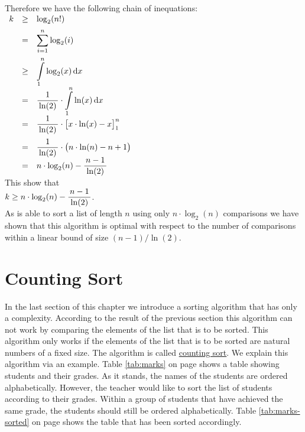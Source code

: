 Therefore we have the following chain of inequations:
\\[0.2cm]
\hspace*{1.3cm}
$
\begin{array}[t]{lcl}
  k & \geq & \displaystyle\log_2(n!) \\[0.2cm]
    & =    & \displaystyle\sum\limits_{i=1}^n \log_2(i) \\[0.5cm]
    & \geq & \displaystyle\int\limits_{1}^n \log_2(x)\, \mathrm{d}x \\[0.2cm]
    & =    & \displaystyle\frac{1}{\,\ln(2)\,} \cdot \int\limits_{1}^n \ln(x)\, \mathrm{d}x  \\[0.2cm]
    & =    & \displaystyle\frac{1}{\,\ln(2)\,} \cdot \bigl[x \cdot \ln(x) - x \bigr]_{1}^n   \\[0.4cm]
    & =    & \displaystyle\frac{1}{\,\ln(2)\,} \cdot \bigl(n \cdot \ln(n) - n + 1\bigr)     \\[0.2cm]
    & =    & \displaystyle n \cdot \log_2(n) - \frac{\,n-1\,}{\,\ln(2)\,}                       
\end{array}
$ 
\\[0.2cm]
This show that
\\[0.2cm]
\hspace*{1.3cm}
$k \geq n \cdot \displaystyle\log_2(n) - \frac{\,n-1\,}{\,\ln(2)\,}$.
\\[0.2cm]
As  is able to sort a list of length $n$ using only $n \cdot \log_2(n)$ comparisons
we have shown that this algorithm is optimal with respect to the number of comparisons within a linear bound of
size $(n-1)/\ln(2)$.




\section{Counting Sort}
In the last section of this chapter we introduce a sorting algorithm that has only a  complexity.
According to the result of the previous section this algorithm can not work by comparing the elements of the
list that is to be sorted.  This algorithm only works if the elements of the list that is to be sorted are
natural numbers of a fixed size.  The algorithm is called
\href{https://en.wikipedia.org/wiki/Counting_sort}{counting sort}. We 
explain this algorithm via an example.  Table \ref{tab:marks} on page \pageref{tab:marks} shows a table showing
students and their grades.  As it stands, the names of the students are ordered alphabetically.  However, the
teacher would like to sort the list of students according to their grades.  Within a group of students that
have achieved the same grade, the students should still be ordered alphabetically.  Table
\ref{tab:marks-sorted} on page \pageref{tab:marks-sorted} shows the table that has been sorted accordingly.

